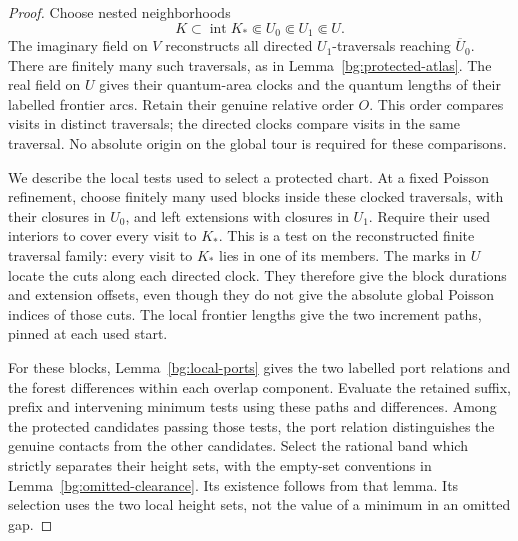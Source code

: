 \begin{proof}
Choose nested neighborhoods
\[
 K\subset\operatorname{int}K_*\Subset U_0\Subset U_1\Subset U.
\]
The imaginary field on $V$ reconstructs all directed $U_1$-traversals
reaching $\overline U_0$.  There are finitely many such traversals,
as in Lemma~\ref{bg:protected-atlas}.  The real field on $U$ gives
their quantum-area clocks and the quantum lengths of their labelled
frontier arcs.  Retain their genuine relative order $O$.  This order
compares visits in distinct traversals; the directed clocks compare
visits in the same traversal.  No absolute origin on the global tour
is required for these comparisons.

We describe the local tests used to select a protected chart.  At a
fixed Poisson refinement, choose finitely many used blocks inside these
clocked traversals, with their closures in $U_0$, and left extensions
with closures in $U_1$.  Require their used interiors to cover every
visit to $K_*$.  This is a test on the reconstructed finite traversal
family: every visit to $K_*$ lies in one of its members.  The marks in
$U$ locate the cuts along each directed clock.  They therefore give the
block durations and extension offsets, even though they do not give the
absolute global Poisson indices of those cuts.  The local frontier
lengths give the two increment paths, pinned at each used start.

For these blocks, Lemma~\ref{bg:local-ports} gives the two labelled
port relations and the forest differences within each overlap
component.  Evaluate the retained suffix, prefix and intervening
minimum tests using these paths and differences.  Among the protected
candidates passing those tests, the port relation distinguishes the
genuine contacts from the other candidates.  Select the rational band
which strictly separates their height sets, with the empty-set
conventions in Lemma~\ref{bg:omitted-clearance}.  Its existence follows
from that lemma.  Its selection uses the two local height sets, not the
value of a minimum in an omitted gap.


\end{proof}
